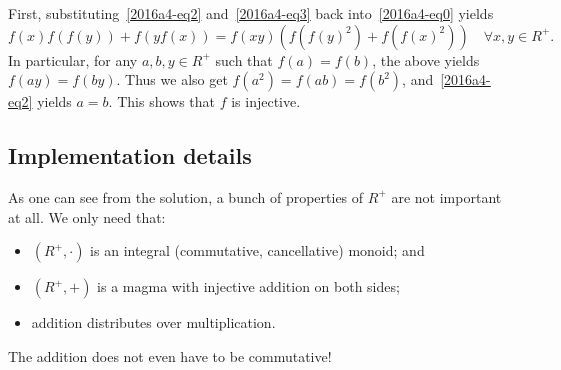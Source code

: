 First, substituting~\eqref{2016a4-eq2} and~\eqref{2016a4-eq3} back into~\eqref{2016a4-eq0} yields
\[ f(x) f(f(y)) + f(y f(x)) = f(xy) (f(f(y)^2) + f(f(x)^2)) \quad \forall x, y \in R^+. \tag{4}\label{2016a4-eq4} \]
In particular, for any $a, b, y \in R^+$ such that $f(a) = f(b)$, the above yields $f(ay) = f(by)$.
Thus we also get $f(a^2) = f(ab) = f(b^2)$, and~\eqref{2016a4-eq2} yields $a = b$.
This shows that $f$ is injective.



\subsection*{Implementation details}

As one can see from the solution, a bunch of properties of $R^+$ are not important at all.
We only need that:
\begin{itemize}
    \item   $(R^+, \cdot)$ is an integral (commutative, cancellative) monoid; and
    \item   $(R^+, +)$ is a magma with injective addition on both sides;
    \item   addition distributes over multiplication.
\end{itemize}

The addition does not even have to be commutative!
